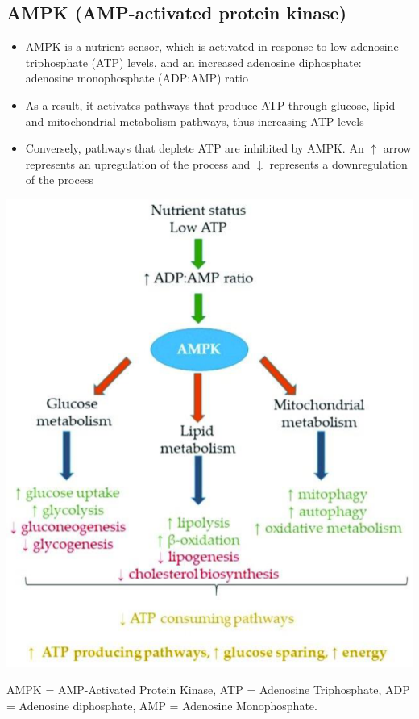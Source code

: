 \documentclass[10pt]{article}
\begin{document}
\subsection*{AMPK (AMP-activated protein kinase)}
\begin{itemize}
    \item AMPK is a nutrient sensor, which is activated in response to low adenosine triphosphate (ATP) levels, and an increased adenosine diphosphate: adenosine monophosphate (ADP:AMP) ratio
    \item As a result, it activates pathways that produce ATP through glucose, lipid and mitochondrial metabolism pathways, thus increasing ATP levels
    \item Conversely, pathways that deplete ATP are inhibited by AMPK. An $\uparrow$ arrow represents an upregulation of the process and $\downarrow$ represents a downregulation of the process
\end{itemize}
\begin{center} 
	\includegraphics*[scale=0.6]{L2_9.png}
\end{center}
AMPK = AMP-Activated Protein Kinase, ATP = Adenosine Triphosphate, ADP = Adenosine diphosphate, AMP = Adenosine Monophosphate.
\end{document}
